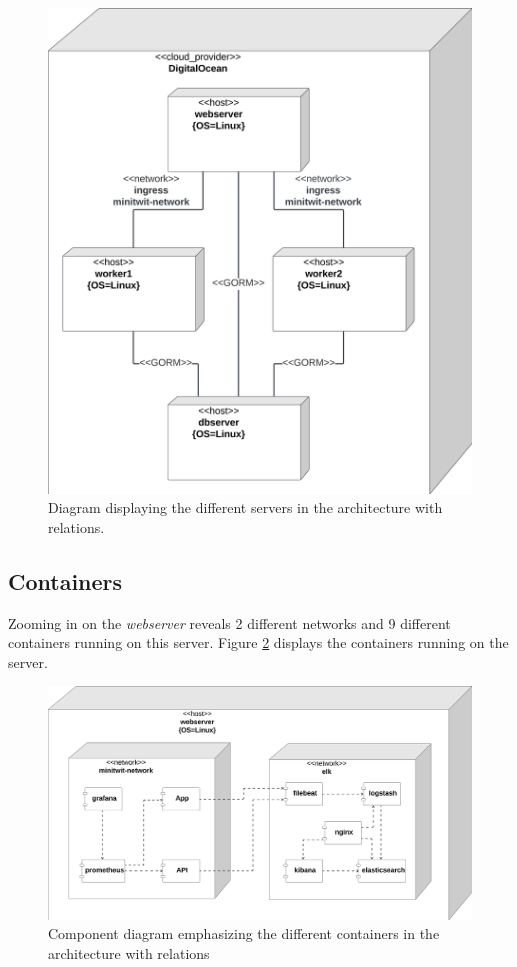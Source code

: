 \documentclass[12pt, a4paper, oneside]{book}
\begin{document}
\begin{figure}[H]
    \centering
    \includegraphics[width=0.6\linewidth]{images/uml-component-servers.png}
    \caption{Diagram displaying the different servers in the architecture with relations.}
    \label{fig:uml-servers}
\end{figure}

\subsection{Containers}
Zooming in on the \textit{webserver} reveals 2 different networks and 9 different containers running on this server.
Figure \ref{fig:uml-containers} displays the containers running on the server.

\begin{figure}[H]
    \centering
    \includegraphics[width=0.8\linewidth]{images/uml-component-containers.png}
    \caption{Component diagram emphasizing the different containers in the architecture with relations}
    \label{fig:uml-containers}
\end{figure}
\end{document}
